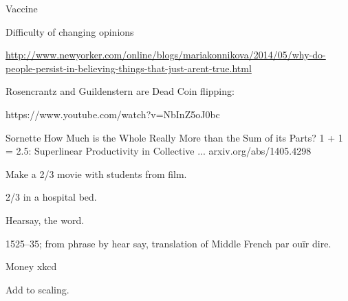 \begin{frame}
Vaccine

Difficulty of changing opinions

\url{http://www.newyorker.com/online/blogs/mariakonnikova/2014/05/why-do-people-persist-in-believing-things-that-just-arent-true.html}

\end{frame}


\begin{frame}

Rosencrantz and Guildenstern are Dead  
Coin flipping:

https://www.youtube.com/watch?v=NbInZ5oJ0bc

\end{frame}

\begin{frame}

  
Sornette
How Much is the Whole Really More than the Sum of its Parts? 1 + 1 = 2.5: Superlinear Productivity in Collective ...
arxiv.org/abs/1405.4298

\end{frame}


\begin{frame}
  Make a 2/3 movie with students from film.

  2/3 in a hospital bed.
\end{frame}

\begin{frame}
  Hearsay, the word.

1525–35; from phrase by hear say, translation of Middle French par ouïr dire.
\end{frame}

\begin{frame}
  Money 
  xkcd 

  Add to scaling.
\end{frame}









\begin{frame}

  
\end{frame}

